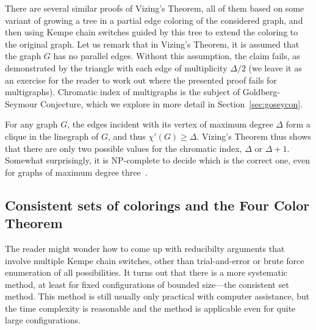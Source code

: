 \documentclass[12pt,twoside,openright,a4paper]{book}
\begin{document}
There are several similar proofs of Vizing's Theorem, all of them based on some variant of growing a tree in a partial edge coloring
of the considered graph, and then using Kempe chain switches guided by this tree to extend the coloring to the original graph.
Let us remark that in Vizing's Theorem, it is assumed that the graph $G$ has no parallel edges.  Without this
assumption, the claim fails, as demonstrated by the triangle with each edge of multiplicity $\Delta/2$
(we leave it as an exercise for the reader to work out where the presented proof fails for multigraphs).
Chromatic index of multigraphs is the subject of Goldberg-Seymour Conjecture, which we explore in more detail
in Section~\ref{sec:goseycon}.

For any graph $G$, the edges incident with its vertex of maximum degree $\Delta$ form a clique in the linegraph of $G$,
and thus $\chi'(G)\ge \Delta$.  Vizing's Theorem thus shows that there are only two possible values for the chromatic index,
$\Delta$ or $\Delta+1$.  Somewhat surprisingly, it is NP-complete to decide which is the correct one, even for graphs of
maximum degree three~\cite{edgenpc}.

\subsection{Consistent sets of colorings and the Four Color Theorem}

The reader might wonder how to come up with reducibilty arguments that involve
multiple Kempe chain switches, other than trial-and-error or brute force enumeration
of all possibilities.  It turns out that there is a more systematic method, at least
for fixed configurations of bounded size---the consistent set method.
This method is still usually only practical
with computer assistance, but the time complexity is reasonable and the method
is applicable even for quite large configurations.
\end{document}
